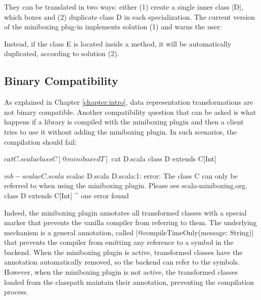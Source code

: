 They can be translated in two ways: either (1) create a single inner class |D|, which boxes and (2) duplicate class D in each specialization. The current version of the miniboxing plug-in implements solution (1) and warns the user:


Instead, if the class E is located inside a method, it will be automatically duplicated, according to solution (2).

\subsection{Binary Compatibility}

As explained in Chapter \ref{chapter:intro}, data representation transformations are not binary compatible. Another compatibility question that can be asked is what happens if a library is compiled with the miniboxing plugin and then a client tries to use it without adding the miniboxing plugin. In such scenarios, the compilation should fail:

\begin{lstlisting-nobreak}
$ cat C.scala
class C[@miniboxed T]

$ cat D.scala
class D extends C[Int]

$ mb-scalac C.scala

$ scalac D.scala
D.scala:1: error: The class C can only be referred to when using the miniboxing plugin. Please see scala-miniboxing.org.
class D extends C[Int]
                ^
one error found
\end{lstlisting-nobreak}

Indeed, the miniboxing plugin annotates all transformed classes with a special marker that prevents the vanilla compiler from referring to them. The underlying mechanism is a general annotation, called |@compileTimeOnly(message: String)| that prevents the compiler from emitting any reference to a symbol in the backend. When the miniboxing plugin is active, transformed classes have the annotation automatically removed, so the backend can refer to the symbols. However, when the miniboxing plugin is not active, the transformed classes loaded from the classpath maintain their annotation, preventing the compilation process.